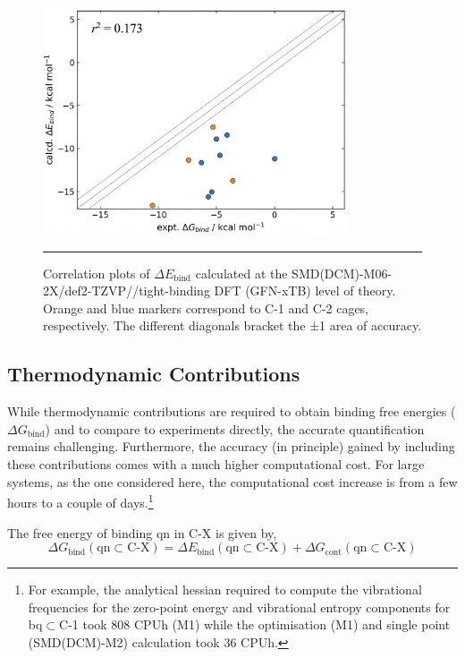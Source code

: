 \documentclass[../../main.tex]{subfiles}
\begin{document}
\begin{figure}[h!]
	\vspace{0.4cm}
	\centering
	\includegraphics[width=9cm]{3/da//figs/figS11}
	\vspace{0.2cm}
	\hrule
	\caption{Correlation plots of $\Delta E_\text{bind}$ calculated at the SMD(DCM)-M06-2X/def2-TZVP//tight-binding DFT (GFN-xTB) level of theory. Orange and blue markers correspond to C-1 and C-2 cages, respectively. The different diagonals bracket the ±1 \kcalx area of accuracy.}
	\label{fig::si_da_11}
\end{figure}

\clearpage  %
\subsection{Thermodynamic Contributions}
\label{section::da_si_3_3}

While thermodynamic contributions are required to obtain binding free energies ($\Delta G_\text{bind}$) and to compare to experiments directly, the accurate quantification remains challenging. Furthermore, the accuracy (in principle) gained by including these contributions comes with a much higher computational cost. For large systems, as the one considered here, the computational cost increase is from a few hours to a couple of days.\footnote{For example, the analytical hessian required to compute the vibrational frequencies for the zero-point energy and vibrational entropy components for bq$\subset$C-1 took 808 CPUh (M1) while the optimisation (M1) and single point (SMD(DCM)-M2) calculation took 36 CPUh.}

The free energy of binding qn in C-X is given by,
\begin{equation}
	\Delta G_\text{bind}(\text{qn}\subset\text{C-X}) =\Delta E_\text{bind} (\text{qn}\subset\text{C-X})+\Delta G_\text{cont}(\text{qn}\subset\text{C-X})
		\label{dg_bind}
	\end{equation}
	
\end{document}
